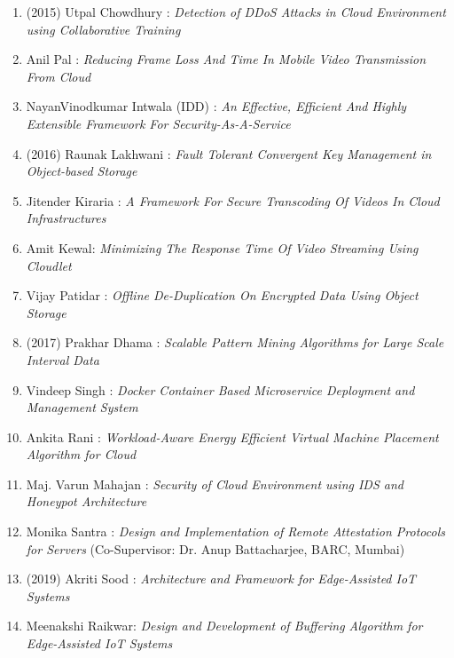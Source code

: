 \begin{itemize}
\begin{enumerate}

\item	(2015) Utpal Chowdhury : \textit{Detection of DDoS Attacks in Cloud Environment using Collaborative Training}
\item		Anil Pal : \textit{Reducing Frame Loss And Time In Mobile Video Transmission From Cloud}	
\item		NayanVinodkumar Intwala (IDD) : \textit{An Effective, Efficient And Highly Extensible Framework For Security-As-A-Service}	


\item	(2016) Raunak Lakhwani : \textit{Fault Tolerant Convergent Key Management in Object-based Storage}
\item		Jitender Kiraria : \textit{A Framework For Secure Transcoding Of Videos In Cloud Infrastructures}
\item		Amit Kewal: \textit{Minimizing The Response Time Of Video Streaming Using Cloudlet}
\item		Vijay Patidar : \textit{Offline De-Duplication On Encrypted Data Using Object Storage}	


\item	(2017) Prakhar Dhama : \textit{Scalable Pattern Mining Algorithms for Large Scale Interval Data}
\item		Vindeep Singh : \textit{Docker Container Based Microservice Deployment and Management System}	
\item		Ankita Rani : \textit{Workload-Aware Energy Efficient Virtual Machine Placement Algorithm for Cloud}	
\item		Maj. Varun Mahajan : 	\textit{Security of Cloud Environment using IDS and Honeypot Architecture}
\item		Monika Santra : 	\textit{Design and Implementation of Remote Attestation Protocols for Servers} (Co-Supervisor:	Dr. Anup Battacharjee, BARC, Mumbai)


\item	(2019) Akriti Sood	: 	\textit{Architecture and Framework for Edge-Assisted IoT Systems}
\item		Meenakshi Raikwar: 	\textit{Design and Development of Buffering Algorithm for Edge-Assisted IoT Systems}


\end{enumerate}
\end{itemize}
